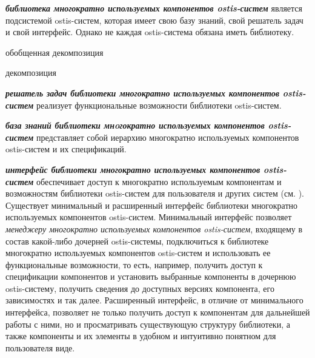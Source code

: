 \textit{\textbf{библиотека многократно используемых компонентов ostis-систем}} является подсистемой ostis-систем, которая имеет свою базу знаний, свой решатель задач и свой интерфейс. Однако не каждая ostis-система обязана иметь библиотеку.

\begin{SCn}
	\begin{scnrelfromset}{обобщенная декомпозиция}
		\begin{scnindent}
			\begin{scnrelfromset}{декомпозиция}
				\begin{scnindent}
				\end{scnindent}
			\end{scnrelfromset}
		\end{scnindent}
	\end{scnrelfromset}
\end{SCn}

\textit{\textbf{решатель задач библиотеки многократно используемых компонентов ostis-систем}} реализует функциональные возможности библиотеки ostis-систем.

\textit{\textbf{база знаний библиотеки мнoгократно используемых компонентов ostis-систем}} представляет собой иерархию многократно используемых компонентов ostis-систем и их спецификаций.

\textit{\textbf{интерфейс библиотеки многократно используемых компонентов ostis-систем}} обеспечивает доступ к многократно используемым компонентам и возможностям библиотеки ostis-систем для пользователя и других систем (см. ). Существует минимальный и расширенный интерфейс библиотеки многократно используемых компонентов ostis-систем. Минимальный интерфейс позволяет \textit{менеджеру многократно используемых компонентов ostis-систем}, входящему в состав какой-либо дочерней ostis-системы, подключиться к библиотеке многократно используемых компонентов ostis-систем и использовать ее функциональные возможности, то есть, например, получить доступ к спецификации компонентов и установить выбранные компоненты в дочернюю ostis-систему, получить сведения до доступных версиях компонента, его зависимостях и так далее. Расширенный интерфейс, в отличие от минимального интерфейса, позволяет не только получить доступ к компонентам для дальнейшей работы с ними, но и просматривать существующую структуру библиотеки, а также компоненты и их элементы в удобном и интуитивно понятном для пользователя виде.

